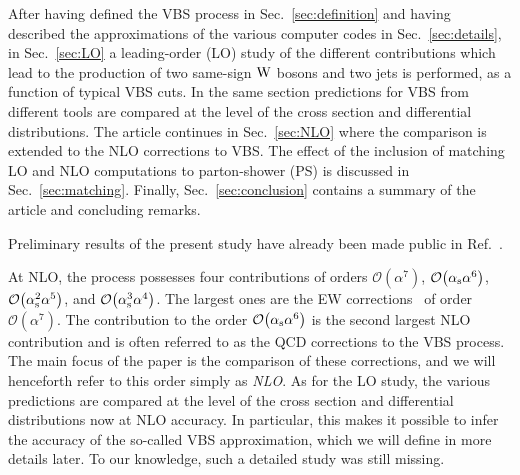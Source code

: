 
\iffalse
The full gauge-invariant process including the $\PW^+\PW^+$ scattering 
 is $\Pp\Pp\to\mu^+\nu_\mu{\rm e}^+\nu_{\rm e}\,\Pj\Pj+\mathrm{X}$.
This final state receives three contributions at leading order (LO) whose coupling orders are $\mathcal{O}{\left(\alpha^{6}\right)}$, $\mathcal{O}{\left(\alpha_{\rm s}\alpha^{5}\right)}$, and $\mathcal{O}{\left(\alphas^{2}\alpha^{4}\right)}$.
They are commonly referred to as electroweak (EW), interference, and QCD contributions, respectively.%
\footnote{The EW contribution is sometimes referred to as the VBS contribution, even it involves also non-VBS contributions.}
\fi
After having defined the VBS process in Sec.~\ref{sec:definition} and having described the approximations of the various computer 
codes in Sec.~\ref{sec:details}, in Sec.~\ref{sec:LO} a leading-order (LO) study 
of the different contributions which lead to the production of two same-sign $\text{W}$ bosons and 
two jets is performed, as a function of typical VBS cuts. In the same section predictions for VBS from different tools are compared at 
the level of the cross section and differential distributions. The article continues in Sec.~\ref{sec:NLO} where the comparison is extended to the
NLO corrections to VBS. The effect of the inclusion of matching LO and NLO computations to parton-shower (PS) is 
discussed in Sec.~\ref{sec:matching}. Finally,
Sec.~\ref{sec:conclusion} contains a summary of the article and concluding remarks.

Preliminary results of the present study have already been made public in Ref.~\cite{Anders:2018gfr}.

\iffalse
At NLO, the process possesses four contributions of orders $\mathcal{O}{\left(\alpha^{7}\right)}$, $\mathcal{O}{\left(\alpha_\text{s}\alpha^{6}\right)}$, $\mathcal{O}{\left(\alpha_\text{s}^{2}\alpha^{5}\right)}$, and $\mathcal{O}{\left(\alpha_\text{s}^{3}\alpha^{4}\right)}$.
The largest ones are the EW corrections~\cite{Biedermann:2017bss,Biedermann:2016yds} of order $\mathcal{O}{\left(\alpha^{7}\right)}$.
The contribution to the order $\mathcal{O}{\left(\alpha_\text{s}\alpha^{6}\right)}$ is the second largest NLO contribution and is often referred to as the QCD corrections to the VBS process.
The main focus of the paper is the comparison of these corrections, and we will henceforth refer to this order simply as \emph{NLO}.
As for the LO study, the various predictions are compared at the level of the cross section and differential distributions now at NLO accuracy.
In particular, this makes it possible to infer the accuracy of the so-called VBS approximation, which we will define in more details later.
To our knowledge, such a detailed study was still missing. 

